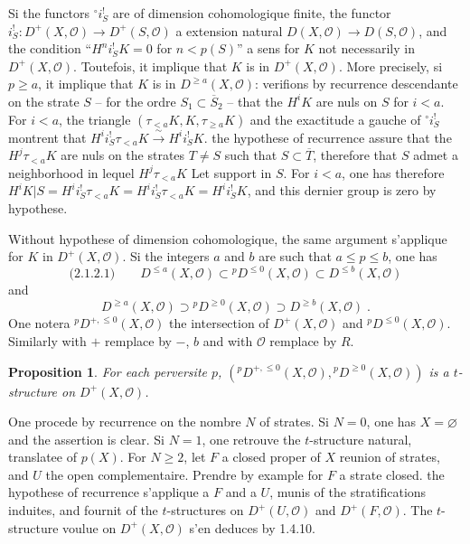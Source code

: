 \documentclass[12pt,a4paper]{article}
\theoremstyle{plain}
\newtheorem{proposition}[theorem]{Proposition}
\theoremstyle{definition}
\begin{document}
Si the functors ${}^\circ i_S^!$ are of dimension cohomologique finite, the functor $i_S^! : D^+(X, \mathcal{O}) \to D^+(S, \mathcal{O})$ a extension natural $D(X, \mathcal{O}) \to D(S, \mathcal{O})$, and the condition ``$H^n i_S^! K = 0$ for $n < p(S)$'' a sens for $K$ not necessarily in $D^+(X, \mathcal{O})$. Toutefois, it implique that $K$ is in $D^+(X, \mathcal{O})$. More precisely, si $p \geqslant a$, it implique that $K$ is in $D^{\geqslant a}(X, \mathcal{O})$: verifions by recurrence descendante on the strate $S$ -- for the ordre $S_1 \subset \overline{S}_2$ -- that the $H^i K$ are nuls on $S$ for $i < a$. For $i < a$, the triangle $(\tau_{< a} K, K, \tau_{\geqslant a} K)$ and the exactitude a gauche of ${}^\circ i_S^!$ montrent that $H^i i_S^! \tau_{< a} K \xrightarrow{\;\sim\;} H^i i_S^! K$. the hypothese of recurrence assure that the $H^j \tau_{< a} K$ are nuls on the strates $T \neq S$ such that $S \subset \overline{T}$, therefore that $S$ admet a neighborhood in lequel $H^j \tau_{< a} K$ Let support in $S$. For $i < a$, one has therefore $H^i K|S = H^i i_S^! \tau_{< a} K = H^i i_S^! \tau_{< a} K = H^i i_S^! K$, and this dernier group is zero by hypothese.

Without hypothese of dimension cohomologique, the same argument s'applique for $K$ in $D^+(X, \mathcal{O})$. Si the integers $a$ and $b$ are such that $a \leqslant p \leqslant b$, one has
\[
\text{(2.1.2.1)}\qquad D^{\leqslant a}(X, \mathcal{O}) \subset {}^p D^{\leqslant 0}(X, \mathcal{O}) \subset D^{\leqslant b}(X, \mathcal{O})
\]
and
\[
D^{\geqslant a}(X, \mathcal{O}) \supset {}^p D^{\geqslant 0}(X, \mathcal{O}) \supset D^{\geqslant b}(X, \mathcal{O})\;.
\]
One notera ${}^p D^{+, \leqslant 0}(X, \mathcal{O})$ the intersection of $D^+(X, \mathcal{O})$ and ${}^p D^{\leqslant 0}(X, \mathcal{O})$. Similarly with $+$ remplace by $-$, $b$ and with $\mathcal{O}$ remplace by $R$.

\begin{proposition}\label{prop:2.1.3}
For each perversite $p$, $({}^p D^{+, \leqslant 0}(X, \mathcal{O}), {}^p D^{\geqslant 0}(X, \mathcal{O}))$ is a $t$-structure on $D^+(X, \mathcal{O})$.
\end{proposition}

One procede by recurrence on the nombre $N$ of strates. Si $N = 0$, one has $X = \varnothing$ and the assertion is clear. Si $N = 1$, one retrouve the $t$-structure natural, translatee of $p(X)$. For $N \geqslant 2$, let $F$ a closed proper of $X$ reunion of strates, and $U$ the open complementaire. Prendre by example for $F$ a strate closed. the hypothese of recurrence s'applique a $F$ and a $U$, munis of the stratifications induites, and fournit of the $t$-structures on $D^+(U, \mathcal{O})$ and $D^+(F, \mathcal{O})$. The $t$-structure voulue on $D^+(X, \mathcal{O})$ s'en deduces by 1.4.10.
\end{document}
